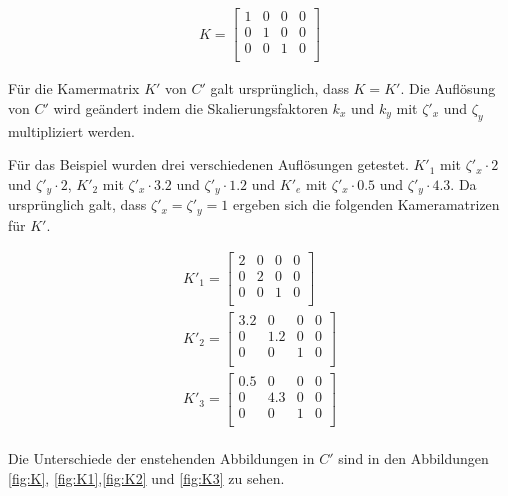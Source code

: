 \begin{gather}
	K = \begin{bmatrix}
		1&0&0&0\\
		0&1&0&0\\
		0&0&1&0\\
	\end{bmatrix}
\end{gather}


Für die Kamermatrix $K'$ von $C'$ galt ursprünglich, dass $K = K'$. Die Auflösung von $C'$ wird geändert indem die Skalierungsfaktoren $k_x$ und $k_y$ mit $\zeta'_x$ und $\zeta_y$ multipliziert werden. 

Für das Beispiel wurden drei verschiedenen Auflösungen getestet.  $K'_1$ mit $\zeta'_x \cdot 2$ und $\zeta'_y \cdot 2$, $K'_2$ mit $\zeta'_x \cdot 3.2$ und $\zeta'_y \cdot 1.2$ und $K'_e$ mit $\zeta'_x \cdot 0.5$ und $\zeta'_y \cdot 4.3$. Da ursprünglich galt, dass $\zeta'_x =\zeta'_y = 1$ ergeben sich die folgenden Kameramatrizen für $K'$.



\begin{gather}
	K'_1 = \begin{bmatrix}
		2&0&0&0\\
		0&2&0&0\\
		0&0&1&0\\
	\end{bmatrix}\\
	K'_2 = \begin{bmatrix}
		3.2&0&0&0\\
		0&1.2&0&0\\
		0&0&1&0\\
	\end{bmatrix}\\
	K'_3 = \begin{bmatrix}
		0.5&0&0&0\\
		0&4.3&0&0\\
		0&0&1&0\\
	\end{bmatrix}
\end{gather}\\

Die Unterschiede der enstehenden Abbildungen in $C'$ sind in den Abbildungen \ref{fig:K}, \ref{fig:K1},\ref{fig:K2} und \ref{fig:K3} zu sehen.  \\
 
